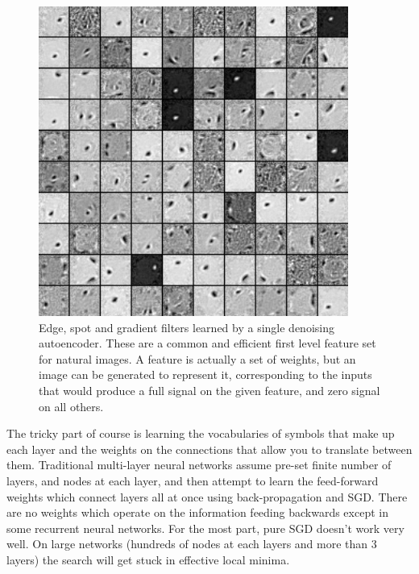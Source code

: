 \documentclass[12pt]{article}
\begin{document}
\begin{doublespacing}
\begin{figure}[p]
\centering
\includegraphics[width=4in,height=4in]{filters_corruption_30}
\caption{Edge, spot and gradient filters learned by a single denoising autoencoder. These are a common and efficient first level feature set for natural images. A feature is actually a set of weights, but an image can be generated to represent it, corresponding to the inputs that would produce a full signal on the given feature, and zero signal on all others.}
\label{fig:gaborz}
\end{figure}
	
	The tricky part of course is learning the vocabularies of symbols that make up each layer and the weights on the connections that allow you to translate between them. Traditional multi-layer neural networks assume pre-set finite number of layers, and nodes at each layer, and then attempt to learn the feed-forward weights which connect layers  all at once using back-propagation and SGD. There are no weights which operate on the information feeding backwards except in some recurrent neural networks. For the most part, pure SGD doesn't work very well. On large networks (hundreds of nodes at each layers and more than 3 layers) the search will get stuck in effective local minima.
	

\end{doublespacing}
\end{document}
